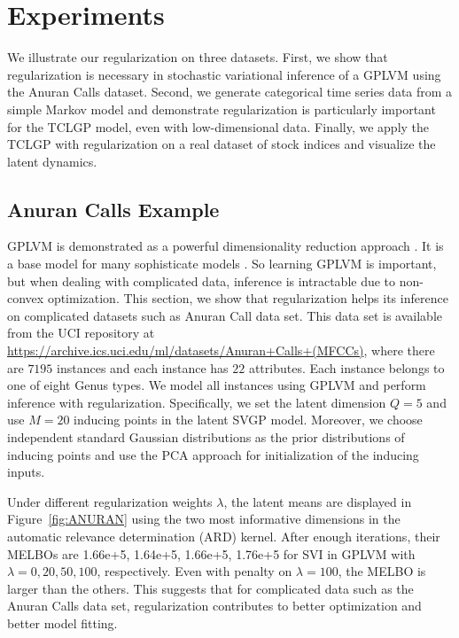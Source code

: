 \documentclass{article}
\begin{document}
\section{Experiments} \label{sec:E}
We illustrate our regularization on three datasets. First, we show that regularization is necessary in stochastic variational inference of a GPLVM using the Anuran Calls dataset. Second, we generate categorical time series data from a simple Markov model and demonstrate regularization is particularly important for the TCLGP model, even with low-dimensional data. Finally, we apply the TCLGP with regularization on a real dataset of stock indices and visualize the latent dynamics.

\subsection{Anuran Calls Example}
GPLVM is demonstrated as a powerful dimensionality reduction approach \citep{Lawrence_2003, Lawrence_2007}. It is a base model for many sophisticate models \citep{Lawrence_2007_HGP, Urtasun_2007, Damianou_2016}. So learning GPLVM is important, but when dealing with complicated data, inference is intractable due to non-convex optimization. This section, we show that regularization helps its inference on complicated datasets such as Anuran Call data set. This data set is available from the UCI repository at \url{https://archive.ics.uci.edu/ml/datasets/Anuran+Calls+(MFCCs)}, where there are $7195$ instances and each instance has $22$ attributes. Each instance belongs to one of eight Genus types. We model all instances using GPLVM and perform inference with regularization. Specifically, we set the latent dimension $Q = 5$ and use $M = 20$ inducing points in the latent SVGP model. Moreover, we choose independent standard Gaussian distributions as the prior distributions of inducing points and use the PCA approach for initialization of the inducing inputs.

Under different regularization weights $\lambda$, the latent means are displayed in Figure~\ref{fig:ANURAN} using the two most informative dimensions in the automatic relevance determination (ARD) kernel. After enough iterations, their MELBOs are 1.66e+5, 1.64e+5, 1.66e+5, 1.76e+5 for SVI in GPLVM with $\lambda = 0 ,20, 50, 100$, respectively. Even with penalty on $\lambda = 100$, the MELBO is larger than the others. This suggests that for complicated data such as the Anuran Calls data set, regularization contributes to better optimization and better model fitting.
\end{document}
